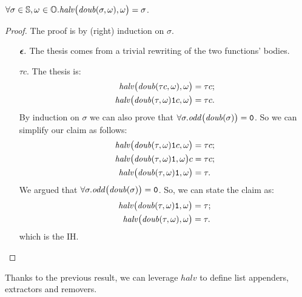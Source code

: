 \begin{lemma}
  \label{lemma:dhleftinverse}
$\forall \sigma \in {\mathbb{S}},
\omega \ { \in \mathbb{O}.} \mathit{halv}\big(\mathit{doub}(\sigma,\omega),\omega\big)
=\sigma$.
\end{lemma}
\begin{proof}
The proof is by (right) induction on $\sigma$.
\begin{itemize}
\itemsep0em

\item[$\bm{\epsilon}.$] The thesis comes from a trivial
rewriting of the two functions' bodies.

\item[$\tau c.$] The thesis is:
\begin{align*}
\mathit{halv}\big(\mathit{doub}(\tau c,\omega),\omega\big) &= \tau c; \\
%
\mathit{halv}\big(\mathit{doub}(\tau,\omega)\one c, \omega\big) &=
\tau c.
\end{align*}
By induction on $\sigma$ we can
also prove that
$\forall \sigma.\mathit{odd}\big(\mathit{doub}(\sigma)\big)=
{\mathtt{0}}$.
So we can simplify our claim as follows:
\begin{align*}
\mathit{halv}\big(\mathit{doub}(\tau,\omega)\one c,\omega\big) &=
\tau c; \\
%
\mathit{halv}\big(\mathit{doub}(\tau,\omega)\one,\omega\big)c
&= \tau c; \\
%
\mathit{halv}\big(\mathit{doub}(\tau,\omega)\one,\omega\big)
&= \tau.
\end{align*}
We argued that $\forall \sigma.\mathit{odd}\big(\mathit{doub}(\sigma)\big)
={\mathtt{0}}$.
So, we can state the claim as:
\begin{align*}
\mathit{halv}\big(\mathit{doub}(\tau,\omega)\one,\omega\big) &= \tau; \\
%
\mathit{halv}\big(\mathit{doub}(\tau,\omega),\omega\big) &= \tau.
\end{align*}
which is the IH.
\end{itemize}
\end{proof}

Thanks to the previous result, we can leverage $\mathit{halv}$ to define list
appenders, extractors and removers.


